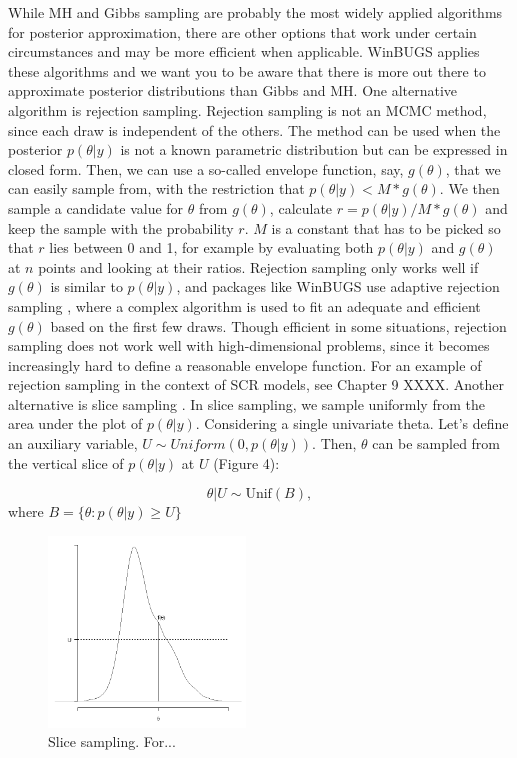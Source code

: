 While MH and Gibbs sampling are probably the most widely applied algorithms for posterior approximation, there are other options that work under certain circumstances and may be more efficient when applicable. WinBUGS applies these algorithms and we want you to be aware that there is more out there to approximate posterior distributions than Gibbs and MH.
One alternative algorithm is rejection sampling. Rejection sampling is not an MCMC method, since each draw is independent of the others. The method can be used when the posterior $p(\theta|y)$ is not a known parametric distribution but can be expressed in closed form. Then, we can use a so-called envelope function, say, $g(\theta)$, that we can easily sample from, with the restriction that $p(\theta|y) < M * g(\theta)$. We then sample a candidate value for $\theta$ from $g(\theta)$, calculate $r = p(\theta|y)/M*g(\theta)$ and keep the sample with the probability $r$. $M$ is a constant that has to be picked so that $r$ lies between 0 and 1, for example by evaluating both $p(\theta|y)$ and $g(\theta)$ at $n$ points and looking at their ratios. Rejection sampling only works well if $g(\theta)$ is similar to $p(\theta|y)$, and packages like WinBUGS use adaptive rejection sampling \citep{gilks_wild:1992}, where a complex algorithm is used to fit an adequate and efficient $g(\theta)$ based on the first few draws. Though efficient in some situations, rejection sampling does not work well with high-dimensional problems, since it becomes increasingly hard to define a reasonable envelope function. For an example of rejection sampling in the context of SCR models, see Chapter 9 XXXX.
Another alternative is slice sampling \citep{neal:2003}. In slice sampling, we sample uniformly from the area under the plot of $p(\theta|y)$. Considering a single univariate theta. Let's define an auxiliary variable, $U \sim  Uniform(0, p(\theta|y))$. Then, $\theta$ can be sampled from the vertical slice of $p(\theta|y)$ at $U$ (Figure 4):

\[
\theta|U \sim \mbox{Unif}(B),
\]
where $B = \{\theta: p(\theta|y) \geq U\}$

\begin{figure}
\begin{center}
\includegraphics[height=2in]{Ch6/figs/slicesampling}
\end{center}
\caption{Slice sampling. For...}
\label{slicesample.fig}
\end{figure}

